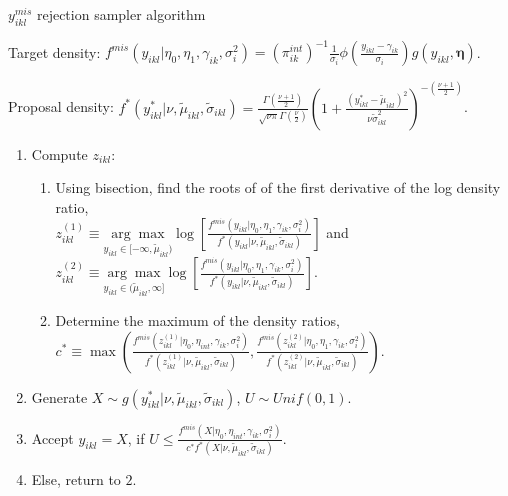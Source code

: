 \begin{algorithm}
\caption{$y_{ikl}^{mis}$ rejection sampler algorithm\label{proteomics:alg:Censored-Intensity-Accept-Reject-Algorithm-TEXT}}


$ $Target density: $f^{mis}(y_{ikl}\vert\eta_{0},\eta_{1},\gamma_{ik},\sigma_{i}^{2})=(\pi_{ik}^{int})^{-1} \frac{1}{\sigma_{i}}\phi\left(\frac{y_{ikl}-\gamma_{ik}}{\sigma_{i}}\right) g(y_{ikl}, \bm \eta)$.

Proposal density: $f^*(y_{ikl}^{*}\vert\nu,\tilde{\mu}_{ikl},\tilde{\sigma}_{ikl})=\frac{\Gamma\left(\frac{\nu+1}{2}\right)}{\sqrt{\nu\pi}\Gamma\left(\frac{\nu}{2}\right)}\left(1+\frac{(y_{ikl}^{*}-\tilde{\mu}_{ikl})^{2}}{\nu\tilde{\sigma}_{ikl}^{2}}\right)^{-\left(\frac{\nu+1}{2}\right)}$.
\begin{enumerate}
\item Compute $z_{ikl}$:

\begin{enumerate}
\item Using bisection, find the roots of of the first derivative of the
log density ratio, \\
$z_{ikl}^{(1)}\equiv\underset{y_{ikl}\in[-\infty,\tilde{\mu}_{ikl})}{\arg\max}\log\left[\frac{f^{mis}(y_{ikl}\vert\eta_{0},\eta_{1},\gamma_{ik},\sigma_{i}^{2})}{f^*(y_{ikl}\vert\nu,\tilde{\mu}_{ikl},\tilde{\sigma}_{ikl})}\right]$
and $z_{ikl}^{(2)}\equiv\underset{y_{ikl}\in(\tilde{\mu}_{ikl},\infty]}{\arg\max}\log\left[\frac{f^{mis}(y_{ikl}\vert\eta_{0},\eta_{1},\gamma_{ik},\sigma_{i}^{2})}{f^*(y_{ikl}\vert\nu,\tilde{\mu}_{ikl},\tilde{\sigma}_{ikl})}\right]$.
\item Determine the maximum of the density ratios,\\
 $c^* \equiv \max\left(\frac{f^{mis}(z_{ikl}^{(1)}\vert\eta_{0},\eta_{int},\gamma_{ik},\sigma_{i}^{2})}{f^*(z_{ikl}^{(1)}\vert\nu,\tilde{\mu}_{ikl},\tilde{\sigma}_{ikl})},\frac{f^{mis}(z_{ikl}^{(2)}\vert\eta_{0},\eta_{1},\gamma_{ik},\sigma_{i}^{2})}{f^*(z_{ikl}^{(2)}\vert\nu,\tilde{\mu}_{ikl},\tilde{\sigma}_{ikl})}\right)$.
\end{enumerate}
\item Generate $X\sim g(y_{ikl}^{*}\vert\nu,\tilde{\mu}_{ikl},\tilde{\sigma}_{ikl})$,
$U\sim Unif(0,1)$.
\item Accept $y_{ikl}=X$, if $U\leq\frac{f^{mis}(X\vert\eta_{0},\eta_{int},\gamma_{ik},\sigma_{i}^{2})}{c^* f^*(X\vert\nu,\tilde{\mu}_{ikl},\tilde{\sigma}_{ikl})}$.
\item Else, return to $2$.\end{enumerate}
\end{algorithm}


